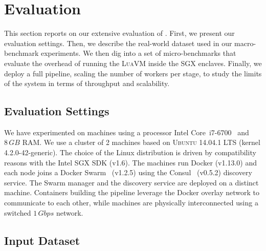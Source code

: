 \section{Evaluation}\label{sec:eval}

This section reports on our extensive evaluation of \SYS{}.
First, we present our evaluation settings.
Then, we describe the real-world dataset used in our macro-benchmark experiments.
We then dig into a set of micro-benchmarks that evaluate the overhead of running the \textsc{LuaVM} inside the SGX enclaves.
Finally, we deploy a full \SYS{} pipeline, scaling the number of workers per stage, to study the limits of the system in terms of throughput and scalability.


\subsection{Evaluation Settings}

We have experimented on machines using a processor Intel Core\texttrademark~i7-6700~\cite{intel:i7_6700} and $8\,GB$ RAM.
We use a cluster of 2 machines based on \textsc{Ubuntu} 14.04.1 LTS (kernel 4.2.0-42-generic).
The choice of the Linux distribution is driven by compatibility reasons with the Intel SGX SDK (v1.6).
The machines run Docker (v1.13.0) and each node joins a Docker Swarm~\cite{docker:swarm_2016} (v1.2.5) using the Consul~\cite{consul} (v0.5.2) discovery service.
The Swarm manager and the discovery service are deployed on a distinct machine.
Containers building the pipeline leverage the Docker overlay network to communicate to each other, while machines are physically interconnected using a switched $1\,Gbps$ network.



\subsection{Input Dataset}

